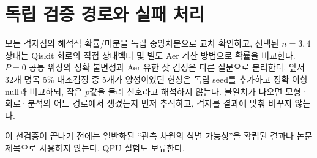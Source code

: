 \documentclass[11pt,a4paper]{article}
\begin{document}
\section{독립 검증 경로와 실패 처리}
모든 격자점의 해석적 확률/미분을 독립 중앙차분으로 교차 확인하고,
선택된 $n=3,4$ 상태는 Qiskit 회로의 직접 상태벡터 및 별도 Aer
계산 방법으로 확률을 비교한다. $P=0$ 공통 위상의 정확 불변성과
Aer 유한 샷 검정은 다른 질문으로 분리한다. 앞서 32개 명목
5\% 대조검정 중 5개가 양성이었던 현상은 독립 seed를 추가하고
정확 이항 null과 비교하되, 작은 $p$값을 물리 신호라고 해석하지
않는다. 불일치가 나오면 모형·회로·분석의 어느 경로에서 생겼는지
먼저 추적하고, 격자를 결과에 맞춰 바꾸지 않는다.

이 선검증이 끝나기 전에는 일반화된 ``관측 차원의 식별 가능성''을
확립된 결과나 논문 제목으로 사용하지 않는다. QPU 실험도 보류한다.
\end{document}
